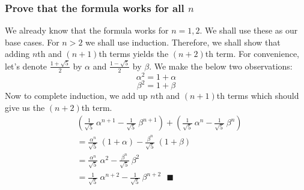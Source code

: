 \documentclass[12pt]{article}
\begin{document}
\subsubsection*{Prove that the formula works for all $n$}
We already know that the formula works for $n=1,2$. We shall use these as our base cases. For $n > 2$ we shall use induction. Therefore, we shall show that adding $n$th and $(n+1)$th terms yields the $(n+2)$th term. For convenience, let's denote $\frac{ 1+\sqrt{5} }{2}$ by $\alpha$ and $\frac{ 1-\sqrt{5} }{2}$ by $\beta$. We make the below two observations:
\[
	\alpha^2 = 1+\alpha
\]
\[
	\beta^2 = 1+\beta
\]
Now to complete induction, we add up $n$th and $(n+1)$th terms which should give us the $(n+2)$th term.
\begin{equation*}
	\begin{aligned}
		& \left( \frac{1}{\sqrt{5}}\ \alpha^{n+1} - \frac{1}{\sqrt{5}}\ \beta^{n+1} \right) + \left( \frac{1}{\sqrt{5}}\ \alpha^n - \frac{1}{\sqrt{5}}\ \beta^n \right)\\
		&= \frac{\alpha^n}{\sqrt{5}}\ (1+\alpha) - \frac{\beta^n}{\sqrt{5}}\ (1+\beta)\\
		&= \frac{\alpha^n}{\sqrt{5}}\ \alpha^2 - \frac{\beta^n}{\sqrt{5}}\ \beta^2\\
		&= \frac{1}{\sqrt{5}}\ \alpha^{n+2} - \frac{1}{\sqrt{5}}\ \beta^{n+2}\ \ \ \blacksquare
	\end{aligned}
\end{equation*}
\end{document}
